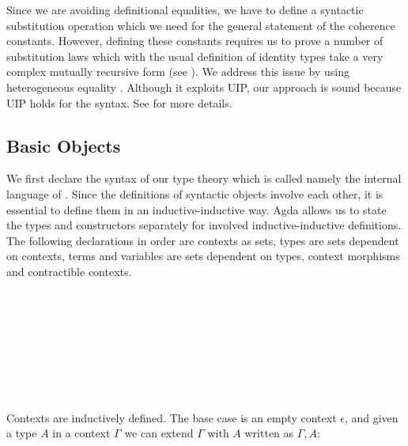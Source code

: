 Since we are avoiding definitional equalities, we have to define a
syntactic substitution operation which we need for the general
statement of the coherence constants. However, defining these
constants requires us to prove a number of substitution laws which
with the usual definition of identity types take a very
complex mutually recursive form (see \cite{txa:csl}). We address this
issue by using heterogeneous equality \cite{mcbride:elimination}. Although 
it exploits UIP, our approach is sound because UIP holds for the
syntax. See  for more details.

\subsection{Basic Objects}

We first declare the syntax of our type theory which is
called \tig{} namely the internal language of \wog. Since the definitions of syntactic objects involve each other, it is essential to define them in an inductive-inductive way. Agda allows us to state the types and constructors separately for involved inductive-inductive definitions. The following declarations in order are contexts as sets,
types are sets dependent on contexts, terms and variables are sets
dependent on types, context morphisms and contractible contexts.

\begin{code}\>\<%
\\
\>  \<[19]%
\>[19]\AgdaSymbol{:} \<%
\\
\>  \AgdaSymbol{(} \AgdaSymbol{:} \AgdaSymbol{)} \<[19]%
\>[19]\AgdaSymbol{:} \<%
\\
\>  \<[19]%
\>[19]\AgdaSymbol{:} \AgdaSymbol{\{} \AgdaSymbol{:} \AgdaSymbol{\}(} \AgdaSymbol{:}  \AgdaSymbol{)}  \<%
\\
\>  \<[19]%
\>[19]\AgdaSymbol{:} \AgdaSymbol{\{} \AgdaSymbol{:} \AgdaSymbol{\}(} \AgdaSymbol{:}  \AgdaSymbol{)}  \<%
\\
\>  \<[19]%
\>[19]\AgdaSymbol{:}     \<%
\\
\>  \<[19]%
\>[19]\AgdaSymbol{:}   \<%
\\
\>\<\end{code}
Contexts are inductively defined. The base case is an empty context $\epsilon$, and given a type $A$ in a context $\Gamma$ we can extend $\Gamma$ with $A$ written as $\Gamma,A$:

